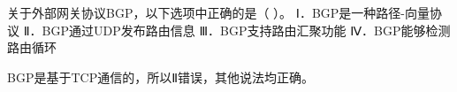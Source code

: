 \question 关于外部网关协议BGP，以下选项中正确的是（ ）。 Ⅰ．BGP是一种路径-向量协议
Ⅱ．BGP通过UDP发布路由信息 Ⅲ．BGP支持路由汇聚功能 Ⅳ．BGP能够检测路由循环
\par{}
\begin{solution}BGP是基于TCP通信的，所以Ⅱ错误，其他说法均正确。
\end{solution}
